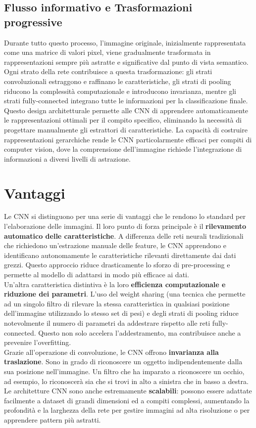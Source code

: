 \documentclass[a4paper,12pt]{report}
\begin{document}
	\subsection{Flusso informativo e Trasformazioni progressive}
	Durante tutto questo processo, l’immagine originale, inizialmente rappresentata come una matrice di valori pixel, viene gradualmente trasformata in rappresentazioni sempre più astratte e significative dal punto di vista semantico. Ogni strato della rete contribuisce a questa trasformazione: gli strati convoluzionali estraggono e raffinano le caratteristiche, gli strati di pooling riducono la complessità computazionale e introducono invarianza, mentre gli strati fully-connected integrano tutte le informazioni per la classificazione finale. \\
	Questo design architetturale permette alle CNN di apprendere automaticamente le rappresentazioni ottimali per il compito specifico, eliminando la necessità di progettare manualmente gli estrattori di caratteristiche. La capacità di costruire rappresentazioni gerarchiche rende le CNN particolarmente efficaci per compiti di computer vision, dove la comprensione dell’immagine richiede l’integrazione di informazioni a diversi livelli di astrazione.
	
	\section{Vantaggi}
	
	Le CNN si distinguono per una serie di vantaggi che le rendono lo standard per l'elaborazione delle immagini. Il loro punto di forza principale è il \textbf{rilevamento automatico delle caratteristiche}. A differenza delle reti neurali tradizionali che richiedono un'estrazione manuale delle feature, le CNN apprendono e identificano autonomamente le caratteristiche rilevanti direttamente dai dati grezzi. Questo approccio riduce drasticamente lo sforzo di pre-processing e permette al modello di adattarsi in modo più efficace ai dati. \\
	Un'altra caratteristica distintiva è la loro \textbf{efficienza computazionale e riduzione dei parametri}. L'uso del weight sharing (una tecnica che permette ad un singolo filtro di rilevare la stessa caratteristica in qualsiasi posizione dell'immagine utilizzando lo stesso set di pesi) e degli strati di pooling riduce notevolmente il numero di parametri da addestrare rispetto alle reti fully-connected. Questo non solo accelera l'addestramento, ma contribuisce anche a prevenire l'overfitting. \\
	Grazie all'operazione di convoluzione, le CNN offrono \textbf{invarianza alla traslazione}. Sono in grado di riconoscere un oggetto indipendentemente dalla sua posizione nell'immagine. Un filtro che ha imparato a riconoscere un occhio, ad esempio, lo riconoscerà sia che si trovi in alto a sinistra che in basso a destra. \\
	Le architetture CNN sono anche estremamente \textbf{scalabili}: possono essere adattate facilmente a dataset di grandi dimensioni ed a compiti complessi, aumentando la profondità e la larghezza della rete per gestire immagini ad alta risoluzione o per apprendere pattern più astratti.
	
\end{document}
